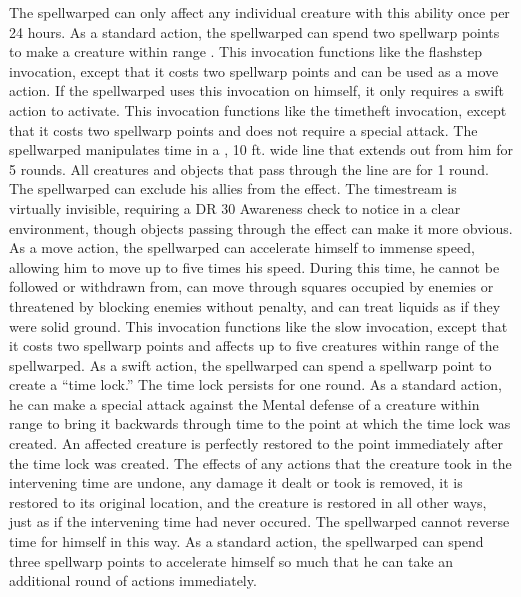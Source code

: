 The spellwarped can only affect any individual creature with this ability once per 24 hours.
As a standard action, the spellwarped can spend two spellwarp points to make a creature within \rngmed range \slowed.
This invocation functions like the flashstep invocation, except that it costs two spellwarp points and can be used as a move action.
If the spellwarped uses this invocation on himself, it only requires a swift action to activate.
This invocation functions like the timetheft invocation, except that it costs two spellwarp points and does not require a special attack.
The spellwarped manipulates time in a \arealarge, 10 ft.
wide line that extends out from him for 5 rounds.
All creatures and objects that pass through the line are \slowed for 1 round.
The spellwarped can exclude his allies from the effect.
The timestream is virtually invisible, requiring a DR 30 Awareness check to notice in a clear environment, though objects passing through the effect can make it more obvious.
As a move action, the spellwarped can accelerate himself to immense speed, allowing him to move up to five times his speed.
During this time, he cannot be followed or withdrawn from, can move through squares occupied by enemies or threatened by blocking enemies without penalty, and can treat liquids as if they were solid ground.
This invocation functions like the slow invocation, except that it costs two spellwarp points and affects up to five creatures within \rngclose range of the spellwarped.
As a swift action, the spellwarped can spend a spellwarp point to create a ``time lock.'' The time lock persists for one round.
As a standard action, he can make a special attack against the Mental defense of a creature within \rngmed range to bring it backwards through time to the point at which the time lock was created.
An affected creature is perfectly restored to the point immediately after the time lock was created.
The effects of any actions that the creature took in the intervening time are undone, any damage it dealt or took is removed, it is restored to its original location, and the creature is restored in all other ways, just as if the intervening time had never occured.
The spellwarped cannot reverse time for himself in this way.
As a standard action, the spellwarped can spend three spellwarp points to accelerate himself so much that he can take an additional round of actions immediately.
